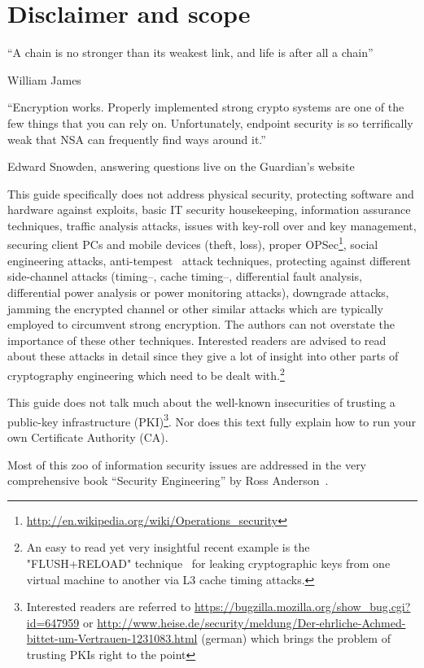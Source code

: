 \newpage
\section{Disclaimer and scope}
\label{section:disclaimer}

\epigraph{``A chain is no stronger than its weakest link, and life is after all a chain''}{William James}
\epigraph{``Encryption works. Properly implemented strong crypto systems are
one of the few things that you can rely on. Unfortunately, endpoint security is
so terrifically weak that NSA can frequently find ways around it.''}{Edward
Snowden, answering questions live on the Guardian's
website~\cite{snowdenGuardianGreenwald}}


This guide specifically does not address physical security, protecting software
and hardware against exploits, basic IT security housekeeping, information
assurance techniques, traffic analysis attacks, issues with key-roll over and
key management, securing client PCs and mobile devices (theft, loss), proper
OPSec\footnote{\url{http://en.wikipedia.org/wiki/Operations_security}}, social
engineering attacks, anti-tempest~\cite{Wikipedia:Tempest} attack techniques,
protecting against different side-channel attacks (timing--, cache timing--,
differential fault analysis, differential power analysis or power monitoring
attacks), downgrade attacks, jamming the encrypted channel or other similar
attacks which are typically employed to circumvent strong encryption.  The
authors can not overstate the importance of these other techniques.  Interested
readers are advised to read about these attacks in detail since they give a lot
of insight into other parts of cryptography engineering which need to be dealt
with.\footnote{An easy to read yet very insightful recent example is the
"FLUSH+RELOAD" technique~\cite{yarom2013flush+} for leaking cryptographic keys
from one virtual machine to another via L3 cache timing attacks.}

This guide does not talk much about the well-known insecurities of trusting a
public-key infrastructure (PKI)\footnote{Interested readers are referred to
\url{https://bugzilla.mozilla.org/show_bug.cgi?id=647959} or
\url{http://www.heise.de/security/meldung/Der-ehrliche-Achmed-bittet-um-Vertrauen-1231083.html}
(german) which brings the problem of trusting PKIs right to the point}. Nor
does this text fully explain how to run your own Certificate Authority (CA). 


Most of this zoo of information security issues are addressed in the very
comprehensive book ``Security Engineering'' by Ross Anderson~\cite{anderson2008security}. 

